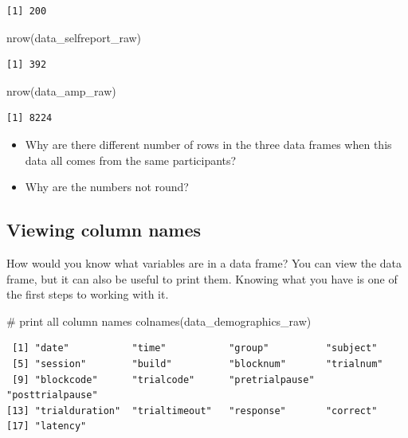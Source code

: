 \documentclass[
  letterpaper,
  DIV=11,
  numbers=noendperiod]{scrreprt}
\newenvironment{Shaded}{\begin{snugshade}}{\end{snugshade}}
\newcommand{\CommentTok}[1]{\textcolor[rgb]{0.37,0.37,0.37}{#1}}
\newcommand{\FunctionTok}[1]{\textcolor[rgb]{0.28,0.35,0.67}{#1}}
\newcommand{\NormalTok}[1]{\textcolor[rgb]{0.00,0.23,0.31}{#1}}
\providecommand{\tightlist}{%
  \setlength{\itemsep}{0pt}\setlength{\parskip}{0pt}}\usepackage{longtable,booktabs,array}
\begin{document}
\begin{verbatim}
[1] 200
\end{verbatim}

\begin{Shaded}
\begin{Highlighting}[]
\FunctionTok{nrow}\NormalTok{(data\_selfreport\_raw)}
\end{Highlighting}
\end{Shaded}

\begin{verbatim}
[1] 392
\end{verbatim}

\begin{Shaded}
\begin{Highlighting}[]
\FunctionTok{nrow}\NormalTok{(data\_amp\_raw)}
\end{Highlighting}
\end{Shaded}

\begin{verbatim}
[1] 8224
\end{verbatim}

\begin{itemize}
\tightlist
\item
  Why are there different number of rows in the three data frames when
  this data all comes from the same participants?
\item
  Why are the numbers not round?
\end{itemize}

\subsection{Viewing column names}\label{viewing-column-names}

How would you know what variables are in a data frame? You can view the
data frame, but it can also be useful to print them. Knowing what you
have is one of the first steps to working with it.

\begin{Shaded}
\begin{Highlighting}[]
\CommentTok{\# print all column names}
\FunctionTok{colnames}\NormalTok{(data\_demographics\_raw)}
\end{Highlighting}
\end{Shaded}

\begin{verbatim}
 [1] "date"           "time"           "group"          "subject"       
 [5] "session"        "build"          "blocknum"       "trialnum"      
 [9] "blockcode"      "trialcode"      "pretrialpause"  "posttrialpause"
[13] "trialduration"  "trialtimeout"   "response"       "correct"       
[17] "latency"       
\end{verbatim}
\end{document}
